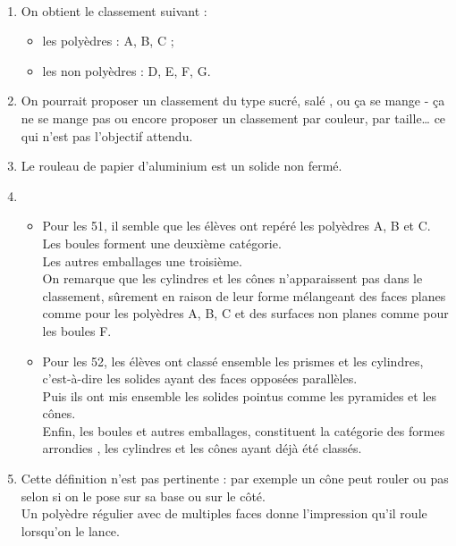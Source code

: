 \begin{colonne*exercice}
\begin{corrige}
   \ \\ [-5mm]
   \begin{enumerate}
      \item On obtient le classement suivant :
      \begin{itemize}
         \item \blue les polyèdres : A, B, C ;
         \item \blue les non polyèdres : D, E, F, G. 
      \end{itemize}
      \item On pourrait proposer un classement du type \og sucré, salé \fg{}, ou \og ça se mange - ça ne se mange pas \fg{} ou encore proposer un classement par couleur, par taille\dots{} ce qui n'est pas l'objectif attendu.
      \item Le rouleau de papier d'aluminium est un {\blue solide non fermé}. 
      \item 
      \begin{itemize}
         \item Pour les 51, il semble que les élèves ont \og repéré \fg{} les polyèdres A, B et C. \\
           Les boules forment une deuxième catégorie. \\
           Les autres emballages une troisième. \\
           On remarque que les cylindres et les cônes n'apparaissent pas dans le classement, sûrement en raison de leur forme mélangeant des faces planes comme pour les polyèdres A, B, C et des surfaces non planes comme pour les boules F.
         \item Pour les 52, les élèves ont classé ensemble les prismes et les cylindres, c'est-à-dire les solides ayant des faces opposées parallèles. \\
         Puis ils ont mis ensemble les solides \og pointus \fg{} comme les pyramides et les cônes. \\
         Enfin, les boules et autres emballages, constituent la catégorie des formes \og arrondies \fg{}, les cylindres et les cônes ayant déjà été classés. 
      \end{itemize}
      \item Cette définition n'est pas pertinente : par exemple un cône peut rouler ou pas selon si on le pose sur sa base ou sur le côté. \\
      Un polyèdre régulier avec de multiples faces donne l'impression qu'il roule lorsqu'on le lance.
   \end{enumerate}
\end{corrige}


\end{colonne*exercice}
